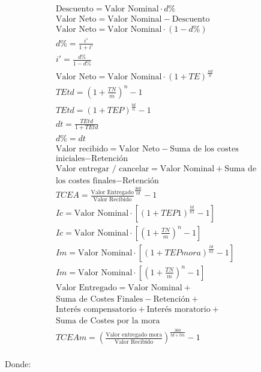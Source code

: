\documentclass[a4paper, twocolumn]{article}
\begin{document}
\begin{gather*}
    \text{Descuento} = \text{Valor Nominal} \cdot d\% \\
    \text{Valor Neto} = \text{Valor Nominal} - \text{Descuento} \\
    \text{Valor Neto} = \text{Valor Nominal} \cdot (1 - d\%) \\
    d\% = \frac{i'}{1 + i'} \\
    i' = \frac{d\%}{1 - d\%} \\
    \text{Valor Neto} = \text{Valor Nominal} \cdot (1 + TE)^{\frac{nd}{n}} \\
    TEtd = (1 + \frac{TN}{m})^n - 1 \\
    TEtd = (1 + TEP)^\frac{td}{n} - 1 \\
    dt = \frac{TEtd}{1 + TEtd} \\
    d\% = dt \\
    \text{Valor recibido} = \text{Valor Neto} - \text{Suma de los costes} \\
    \text{iniciales} - \text{Retención} \\
    \text{Valor entregar / cancelar} = \text{Valor Nominal} + \text{Suma de} \\
    \text{los costes finales} - \text{Retención} \\
    TCEA = \frac{\text{Valor Entregado}}{\text{Valor Recibido}}^\frac{360}{td} - 1 \\
    Ic = \text{Valor Nominal} \cdot [(1 + TEP1)^\frac{td}{n1} - 1] \\
    Ic = \text{Valor Nominal} \cdot [(1 + \frac{TN}{m})^n - 1] \\
    Im = \text{Valor Nominal} \cdot [(1 + TEPmora)^\frac{td}{n1} - 1] \\
    Im = \text{Valor Nominal} \cdot [(1 + \frac{TN}{m})^n - 1] \\
    \text{Valor Entregado} = \text{Valor Nominal} + \\
    \text{Suma de Costes Finales} - \text{Retención} + \\
    \text{Interés compensatorio} + \text{Interés moratorio} + \\
    \text{Suma de Costes por la mora} \\
    TCEAm = (\frac{\text{Valor entregado mora}}{\text{Valor Recibido}})^{\frac{360}{td + tm}} - 1 \\
\end{gather*}

\newpage

Donde:
\end{document}
